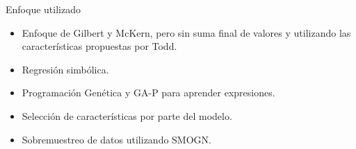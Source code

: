 \documentclass{beamer}
\begin{document}
\begin{frame}{Enfoque utilizado}

	\begin{itemize}
		\item Enfoque de Gilbert y McKern, pero sin suma final de valores y utilizando las características propuestas por Todd.
		\item Regresión simbólica.
		\item Programación Genética y GA-P para aprender expresiones.
		\item Selección de características por parte del modelo.
		\item Sobremuestreo de datos utilizando SMOGN.
	\end{itemize}

\end{frame}
\end{document}
